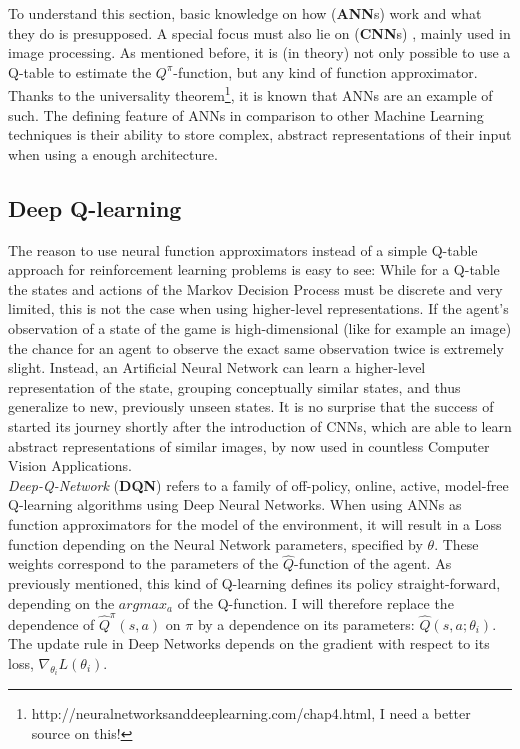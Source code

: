To understand this section, basic knowledge on how  (\textbf{ANN}s) work and what they do is presupposed. A special focus must also lie on  (\textbf{CNN}s) \cite{yann_lecun_gradient-based_1998}, mainly used in image processing. As mentioned before, it is (in theory) not only possible to use a Q-table to estimate the $Q^\pi$-function, but any kind of function approximator. Thanks to the universality theorem\footnote{http://neuralnetworksanddeeplearning.com/chap4.html, I need a better source on this!}, it is known that ANNs are an example of such. The defining feature of ANNs in comparison to other Machine Learning techniques is their ability to store complex, abstract representations of their input when using a  enough architecture.

\subsection{Deep Q-learning} \label{ch:DQN}

\noindent The reason to use neural function approximators instead of a simple Q-table approach for reinforcement learning problems is easy to see: While for a Q-table the states and actions of the Markov Decision Process must be discrete and very limited, this is not the case when using higher-level representations. If the agent's observation of a state of the game is high-dimensional (like for example an image) the chance for an agent to observe the exact same observation twice is extremely slight. Instead, an Artificial Neural Network can learn a higher-level representation of the state, grouping conceptually similar states, and thus generalize to new, previously unseen states. It is no surprise that the success of  started its journey shortly after the introduction of CNNs, which are able to learn abstract representations of similar images, by now used in countless Computer Vision Applications. \\%

\textit{Deep-Q-Network} (\textbf{DQN}) refers to a family of off-policy, online, active, model-free Q-learning algorithms using Deep Neural Networks. %
When using ANNs as function approximators for the model of the environment, it will result in a Loss function depending on the Neural Network parameters, specified by $\theta$. These weights correspond to the parameters of the $\hat{Q}$-function of the agent. As previously mentioned, this kind of Q-learning defines its policy straight-forward, depending on the $argmax_a$ of the Q-function. I will therefore replace the dependence of $\hat{Q}^\pi(s,a)$ on $\pi$ by a dependence on its parameters: $\hat{Q}(s,a;\theta_i)$. The update rule in Deep Networks depends on the gradient with respect to its loss, $\nabla_{\theta_i}L(\theta_i)$.  %

